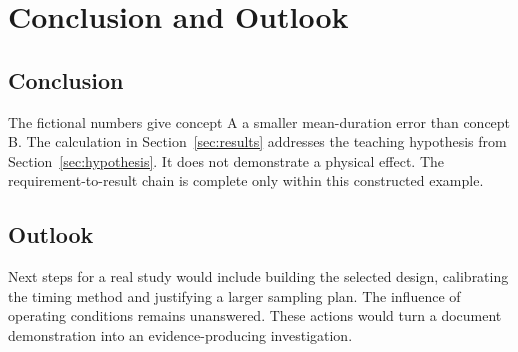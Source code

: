 \chapter{Conclusion and Outlook}
\label{chap:conclusion_and_outlook}

\section{Conclusion}
\label{sec:conclusion}
The fictional numbers give concept A a smaller mean-duration error than concept B.
The calculation in Section~\ref{sec:results} addresses the teaching hypothesis
from Section~\ref{sec:hypothesis}. It does not demonstrate a physical effect.
The requirement-to-result chain is complete only within this constructed example.

\section{Outlook}
Next steps for a real study would include building the selected design,
calibrating the timing method and justifying a larger sampling plan.
The influence of operating conditions remains unanswered. These actions would
turn a document demonstration into an evidence-producing investigation.
